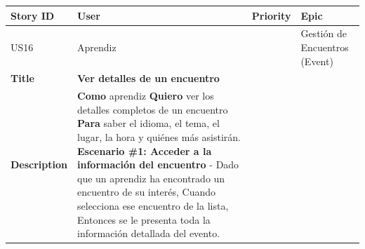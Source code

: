 {\def\LTcaptype{none} %
\begin{longtable}[]{@{}
  >{\raggedright\arraybackslash}p{}
  >{\raggedright\arraybackslash}p{}
  >{\raggedright\arraybackslash}p{}
  >{\raggedright\arraybackslash}p{}@{}}
\toprule\noalign{}
\begin{minipage}[b]{\linewidth}\raggedright
Story ID
\end{minipage} & \begin{minipage}[b]{\linewidth}\raggedright
User
\end{minipage} & \begin{minipage}[b]{\linewidth}\raggedright
Priority
\end{minipage} & \begin{minipage}[b]{\linewidth}\raggedright
Epic
\end{minipage} \\
\midrule\noalign{}
\endhead
\bottomrule\noalign{}
\endlastfoot
US16 & Aprendiz & 2 & Gestión de Encuentros (Event) \\
\textbf{Title} & \textbf{Ver detalles de un encuentro} & & \\
\textbf{Description} & \textbf{Como} aprendiz \textbf{Quiero} ver los
detalles completos de un encuentro \textbf{Para} saber el idioma, el
tema, el lugar, la hora y quiénes más asistirán. \textbf{Escenario \#1:
Acceder a la información del encuentro} - Dado que un aprendiz ha
encontrado un encuentro de su interés, Cuando selecciona ese encuentro
de la lista, Entonces se le presenta toda la información detallada del
evento. & & \\
\end{longtable}
}

